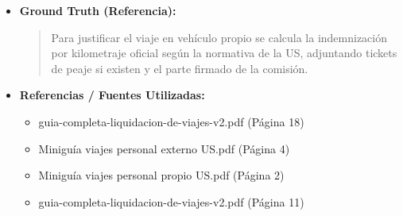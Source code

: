 \documentclass[12pt,a4paper,oneside]{report}
\begin{document}
\begin{itemize}
\begin{itemize}
\begin{quote}
En resumen, la comisión de servicios es un documento que autoriza a un empleado a realizar un viaje por razón del servicio, y la justificación del kilometraje en vehículo particular requiere la presentación de una autorización de desplazamiento, la factura correspondiente y el informe de conformidad firmado por el investigador principal, así como el cumplimiento de los límites máximos indemnizables establecidos por la Universidad de Sevilla.

Referencias normativas:

\begin{itemize}
  \item Instrucción 3/2025 de la Gerencia
  \item Miniguía para viajes por razón del servicio (página 2)
  \item Guía completa de liquidación de viajes (página 11)
  \item Miniguía para la gestión de bolsas de viaje (página 4)
\end{itemize}
                \end{quote}
          \item \textbf{{Ground Truth (Referencia):}} \\
                \begin{quote}
Para justificar el viaje en vehículo propio se calcula la indemnización por kilometraje oficial según la normativa de la US, adjuntando tickets de peaje si existen y el parte firmado de la comisión.
                \end{quote}
          \item \textbf{{Referencias / Fuentes Utilizadas:}} \\
                \begin{itemize}
                  \item guia-completa-liquidacion-de-viajes-v2.pdf (Página 18)
                  \item Miniguía viajes personal externo US.pdf (Página 4)
                  \item Miniguía viajes personal propio US.pdf (Página 2)
                  \item guia-completa-liquidacion-de-viajes-v2.pdf (Página 11)
                \end{itemize}
        \end{itemize}


\end{itemize}
\end{document}
